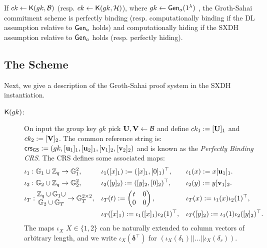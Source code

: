 \begin{theorem} If $ck\gets\mathsf{K}(gk,\mathcal{B})$ (resp. $ck\gets\mathsf{K}(gk,\mathcal{H})$), where $gk\gets\mathsf{Gen}_a(1^\lambda)$ , the Groth-Sahai commitment scheme is perfectly binding (resp. computationally binding if the DL assumption relative to $\mathsf{Gen}_a$ holds) and computationally hiding if the SXDH assumption relative to $\mathsf{Gen}_a$ holds (resp. perfectly hiding).

\end{theorem}

\subsection{The Scheme}
Next, we give a description of the Groth-Sahai proof system in the SXDH instantiation.
\begin{description}
\item[$\mathsf{K}(gk)$:]  On input the group key $gk$ pick $\mathbf{{U}},\mathbf{{V}}\gets\mathcal{B}$ and define $ck_1 := [\mathbf{{U}}]_1$ and $ck_2:=[\mathbf{{V}}]_2$.
   The common reference string is:
   $\mathsf{crs}_{\mathsf{GS}}:=(gk,[\mathbf{u}_1]_1,[\mathbf{u}_2]_1,[\mathbf{v}_1]_2,[\mathbf{v}_2]_2)$ and is known as the \emph{Perfectly Binding CRS}.
The CRS defines some associated maps:
\begin{align*}
&\iota_1: \mathbb{G}_1 \cup \mathbb{Z}_q \rightarrow \mathbb{G}_1^2,& &\iota_1([x]_1):=([x]_1,[0]_1)^\top,& &\iota_1(x):=x[\mathbf{u}_1]_1. \\
&\iota_2: \mathbb{G}_2 \cup \mathbb{Z}_q \rightarrow \mathbb{G}_2^2,& &\iota_2([y]_2):=([y]_2,[0]_2)^\top,& &\iota_2(y):=y[\mathbf{v}_1]_2.\\
&\iota_T: \begin{matrix}\mathbb{Z}_q\cup\mathbb{G}_1\cup\\\mathbb{G}_2\cup\mathbb{G}_T\end{matrix} \rightarrow \mathbb{G}_T^{2\times2}, &
    &\iota_T(t):=\left(\begin{matrix}t & 0 \\ 0 & 0\end{matrix}\right),& & \iota_T(x) := \iota_1(x)\iota_2(1)^\top,\\
&                                       & &\iota_T([x]_1):=\iota_1([x]_1)\iota_2(1)^\top,& &\iota_T([y]_2) := \iota_1(1)\iota_2([y]_2)^\top.
\end{align*}
The maps $\iota_X$ $X \in \{1,2\}$ can be naturally extended to column vectors of arbitrary length, and we write $\iota_X(\boldsymbol \delta^{\top})$ for 
$(\iota_X(\delta_1)|| \ldots ||\iota_X(\delta_r))$.


\end{description}
